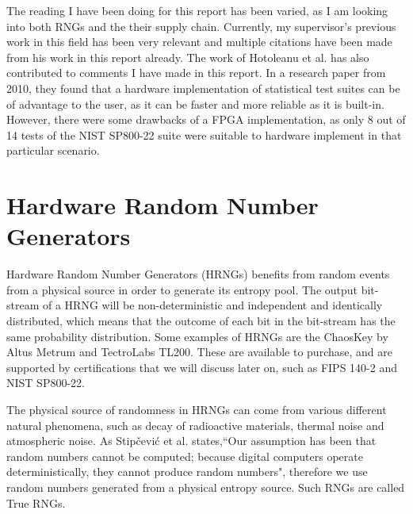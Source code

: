 \documentclass[]{final_report}
\begin{document}
\par{The reading I have been doing for this report has been varied, as I am looking into both RNGs and the their supply chain. Currently, my supervisor's previous work in this field has been very relevant and multiple citations have been made from his work in this report already. The work of Hotoleanu et al. has also contributed to comments I have made in this report. In a research paper from 2010, they found that a hardware implementation of statistical test suites can be of advantage to the user, as it can be faster and more reliable as it is built-in. However, there were some drawbacks of a FPGA implementation, as only 8 out of 14 tests of the NIST SP800-22 suite were suitable to hardware implement in that particular scenario.\cite{Hotoleanu:2010}}

\newpage
\section*{Hardware Random Number Generators}

\par{Hardware Random Number Generators (HRNGs) benefits from random events from a physical source in order to generate its entropy pool. The output bit-stream of a HRNG will be non-deterministic and independent and identically distributed, which means that the outcome of each bit in the bit-stream has the same probability distribution. Some examples of HRNGs are the ChaosKey by Altus Metrum and TectroLabs TL200. These are available to purchase, and are supported by certifications that we will discuss later on, such as FIPS 140-2 and NIST SP800-22.}

\par{The physical source of randomness in HRNGs can come from various different natural phenomena, such as decay of radioactive materials\cite{Rohe:2003}, thermal noise\cite{Rohe:2003} and atmospheric noise\cite{Jun:1999}. As Stipčević et al.\cite{Stipcevic:2014} states,``Our assumption has been that random numbers cannot be computed; because digital computers operate deterministically, they cannot produce random numbers", therefore we use random numbers generated from a physical entropy source. Such RNGs are called True RNGs.}
\end{document}
